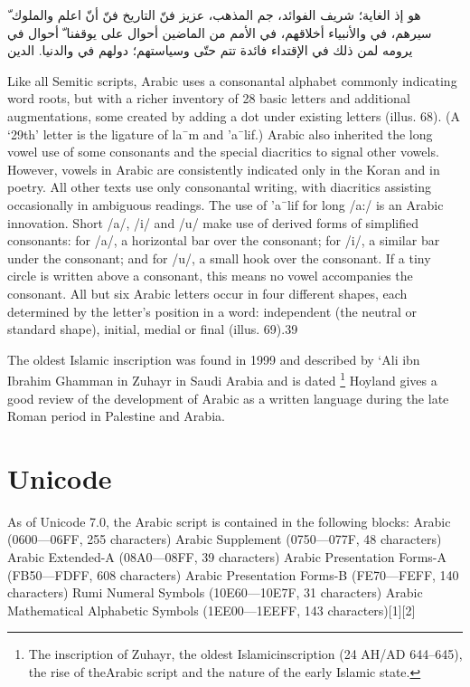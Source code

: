 \begin{Arabic}


ّ هو إذ الغاية؛ شريف الفوائد، جم المذهب، عزيز فنّ التاريخ فنّ أنّ اعلم
والملوك سيرهم، في والأنبياء أخلاقهم، في الأمم من الماضين أحوال على يوقفنا
ّ أحوال في يرومه لمن ذلك في الإقتداء فائدة تتم حتّى وسياستهم؛ دولهم في
والدنيا. الدين


\end{Arabic}

Like all Semitic scripts, Arabic uses a consonantal alphabet
commonly indicating word roots, but with a richer inventory of
28 basic letters and additional augmentations, some created by
adding a dot under existing letters (illus. 68). (A ‘29th’ letter is
the ligature of la¯m and ’a¯lif.) Arabic also inherited the long vowel
use of some consonants and the special diacritics to signal
other vowels. However, vowels in Arabic are consistently indicated
only in the Koran and in poetry. All other texts use only
consonantal writing, with diacritics assisting occasionally in
ambiguous readings. The use of ’a¯lif for long /a:/ is an Arabic
innovation. Short /a/, /i/ and /u/ make use of derived forms of
simplified consonants: for /a/, a horizontal bar over the consonant;
for /i/, a similar bar under the consonant; and for /u/, a
small hook over the consonant. If a tiny circle is written above a
consonant, this means no vowel accompanies the consonant. All
but six Arabic letters occur in four different shapes, each determined
by the letter’s position in a word: independent (the neutral
or standard shape), initial, medial or final (illus. 69).39

The oldest Islamic inscription was found in 1999 and described by ‘{}Ali ibn Ibrahim Ghamman in Zuhayr in 
Saudi Arabia and is dated \footnote{ 
The inscription of Zuhayr, the oldest Islamicinscription (24 AH/AD 644–645), the rise of theArabic script and the nature of the early Islamic state.} Hoyland\cite{hoyland2010} gives a good review of the development of Arabic as
a written language during the late Roman period in Palestine and Arabia. 


\section{Unicode}

As of Unicode 7.0, the Arabic script is contained in the following blocks:
Arabic (0600—06FF, 255 characters)
Arabic Supplement (0750—077F, 48 characters)
Arabic Extended-A (08A0—08FF, 39 characters)
Arabic Presentation Forms-A (FB50—FDFF, 608 characters)
Arabic Presentation Forms-B (FE70—FEFF, 140 characters)
Rumi Numeral Symbols (10E60—10E7F, 31 characters)
Arabic Mathematical Alphabetic Symbols (1EE00—1EEFF, 143 characters)[1][2]

